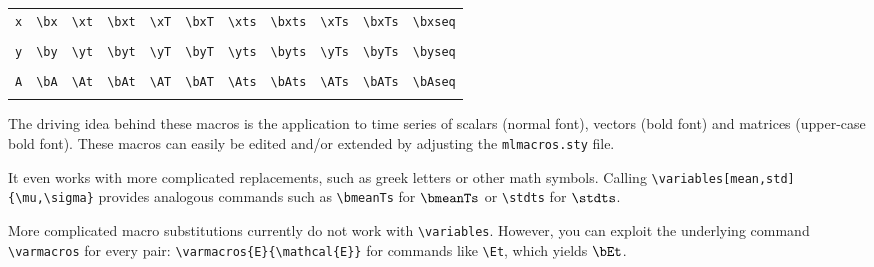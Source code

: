 \documentclass
[
twoside, %
]
{article}
\begin{document}
\setlength{}
\begin{table}[h!]
	\centering
	\begin{tabular}{ccccccccccc}
		\texttt{x} & \texttt{\textbackslash bx}& \texttt{\textbackslash xt} & \texttt{\textbackslash bxt} &\texttt{\textbackslash xT} & \texttt{\textbackslash bxT} & \texttt{\textbackslash xts} & \texttt{\textbackslash bxts} & \texttt{\textbackslash xTs} & \texttt{\textbackslash bxTs} & \texttt{\textbackslash bxseq}\\
					& \bx & \xt & \bxt & \xT & \bxT & \xts  & \bxts & \xTs & \bxTs & \bxseq\\
		\texttt{y} & \texttt{\textbackslash by}& \texttt{\textbackslash yt} & \texttt{\textbackslash byt} &\texttt{\textbackslash yT} & \texttt{\textbackslash byT} & \texttt{\textbackslash yts} & \texttt{\textbackslash byts} & \texttt{\textbackslash yTs} & \texttt{\textbackslash byTs} &\texttt{\textbackslash byseq}\\
		& \by & \yt & \byt & \yT & \byT & \yts  & \byts & \yTs & \byTs & \byseq\\
		\texttt{A} & \texttt{\textbackslash bA}& \texttt{\textbackslash At} & \texttt{\textbackslash bAt} &\texttt{\textbackslash AT} & \texttt{\textbackslash bAT} & \texttt{\textbackslash Ats} & \texttt{\textbackslash bAts} & \texttt{\textbackslash ATs} & \texttt{\textbackslash bATs} & \texttt{\textbackslash bAseq}\\
		& \bA & \At & \bAt & \AT & \bAT & \Ats  & \bAts & \ATs & \bATs & \bAseq
	\end{tabular}
\end{table}
\setlength{}

The driving idea behind these macros is the application to time series of scalars (normal font), vectors (bold font) and matrices (upper-case bold font). These macros can easily be edited and/or extended by adjusting the \texttt{mlmacros.sty} file.

It even works with more complicated replacements, such as greek letters or other math symbols. 
Calling \texttt{\textbackslash variables[mean,std]\{\textbackslash mu,\textbackslash sigma\}} provides analogous commands such as \texttt{\textbackslash bmeanTs} for $\bmeanTs$ or \texttt{\textbackslash stdts} for $\stdts$.

More complicated macro substitutions currently do not work with \texttt{\textbackslash variables}. However, you can exploit the underlying command \texttt{\textbackslash varmacros} for every pair: \texttt{\textbackslash varmacros\{E\}\{\textbackslash mathcal\{E\}\}} for commands like \texttt{\textbackslash Et}, which yields $\bEt$.
\end{document}

